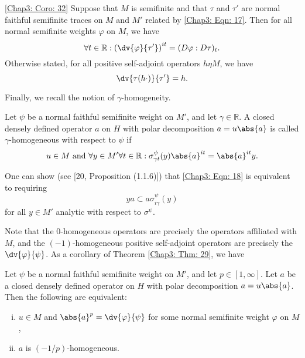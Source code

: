 \begin{corollary}\ref{Chap3: Coro: 32}
    Suppose that $M$ is semifinite and that $\tau$ and $\tau'$ are normal faithful semifinite traces on $M$ and $M'$ related by \eqref{Chap3: Eqn: 17}. Then for all normal semifinite weights $\varphi$ on $M$, we have
    \[
        \forall t\in \mathbb{R}:\left( \dv{\varphi}{\tau'} \right)^{it}=(D\varphi:D\tau)_t.
    \]
    Otherwise stated, for all positive self-adjoint operators $h\eta M$, we have
    \[
        \dv{\tau(h\cdot)}{\tau'}=h.
    \]
\end{corollary}
Finally, we recall the notion of $\gamma$-homogeneity.
\begin{definition}
    Let $\psi$ be a normal faithful semifinite weight on $M'$, and let $\gamma\in \mathbb{R}$. A closed densely defined operator $a$ on $H$ with polar decomposition $a=u\abs{a}$ is called $\gamma$-homogeneous with respect to $\psi$ if
    \begin{equation}\label{Chap3: Eqn: 18}
        u\in M \text{ and } \forall y\in M' \forall t\in \mathbb{R}: \sigma_{\gamma t}^\psi(y)\abs{a}^{it}=\abs{a}^{it}y.
    \end{equation}
\end{definition}
One can show (see [20, Proposition (1.1.6)]) that \eqref{Chap3: Eqn: 18} is equivalent to requiring
\begin{equation}
    ya\subset a\sigma_{i\gamma}^\psi(y)
\end{equation}
for all $y\in M'$ analytic with respect to $\sigma^\psi$.\par
Note that the 0-homogeneous operators are precisely the operators affiliated with $M$, and the $(-1)$-homogeneous positive self-adjoint operators are precisely the $\dv{\varphi}{\psi}$. As a corollary of Theorem \ref{Chap3: Thm: 29}, we have
\begin{corollary}
    Let $\psi$ be a normal faithful semifinite weight on $M'$, and let $p\in [1,\infty]$. Let $a$ be a closed densely defined operator on $H$ with polar decomposition $a=u\abs{a}$. Then the following are equivalent:
    \begin{enumerate}[(i)]
        \item $u\in M$ and $\abs{a}^p=\dv{\varphi}{\psi}$ for some normal semifinite weight $\varphi$ on $M$,
        \item $a$ is $(-1/p)$-homogeneous.
    \end{enumerate}
\end{corollary}
% 